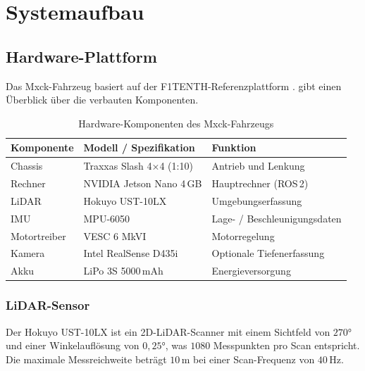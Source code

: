 \chapter{Systemaufbau}
\label{chap:systemaufbau}

\section{Hardware-Plattform}
\label{sec:hardware}

Das Mxck-Fahrzeug basiert auf der F1TENTH-Referenzplattform
\cite{okelly2020f1tenth}.
 gibt einen Überblick über die verbauten Komponenten.

\begin{table}[H]
  \centering
  \caption{Hardware-Komponenten des Mxck-Fahrzeugs}
  \label{tab:hardware}
  \begin{tabular}{@{}lll@{}}
    \toprule
    \textbf{Komponente} & \textbf{Modell / Spezifikation} & \textbf{Funktion} \\
    \midrule
    Chassis     & Traxxas Slash 4×4 (1:10)     & Antrieb und Lenkung \\
    Rechner     & NVIDIA Jetson Nano 4\,GB     & Hauptrechner (ROS\,2) \\
    LiDAR       & Hokuyo UST-10LX              & Umgebungserfassung \\
    IMU         & MPU-6050                     & Lage- / Beschleunigungsdaten \\
    Motortreiber & VESC 6 MkVI                 & Motorregelung \\
    Kamera      & Intel RealSense D435i        & Optionale Tiefenerfassung \\
    Akku        & LiPo 3S 5000\,mAh            & Energieversorgung \\
    \bottomrule
  \end{tabular}
\end{table}

\subsection{LiDAR-Sensor}
\label{subsec:lidar}

Der Hokuyo UST-10LX ist ein 2D-LiDAR-Scanner mit einem Sichtfeld
von \(270°\) und einer Winkelauflösung von \(0{,}25°\), was
\(1080\) Messpunkten pro Scan entspricht.
Die maximale Messreichweite beträgt \(10\,\text{m}\) bei einer
Scan-Frequenz von \(40\,\text{Hz}\).

